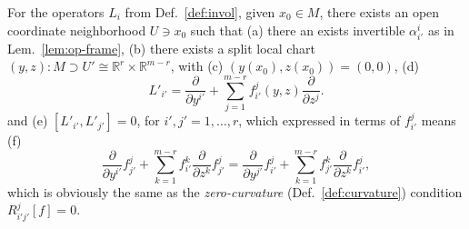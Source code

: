 \begin{lemma} \label{lem:loc-init-split}
For the operators $L_i$ from Def.~\ref{def:invol}, given $x_0 \in M$, there exists
an open coordinate neighborhood $U\ni x_0$ such that (a) there an exists invertible
$\alpha_{i'}^i$ as in Lem.~\ref{lem:op-frame}, (b) there exists a split local
chart $(y,z)\colon M \supset U' \cong \mathbb{R}^r \times \mathbb{R}^{m-r}$, with
(c) $(y(x_0),z(x_0)) = (0,0)$, (d)
\[
  L'_{i'} = \frac{\partial}{\partial y^{i'}} + \sum_{j=1}^{m-r} f_{i'}^j(y,z) \frac{\partial}{\partial z^j} .
\]
and (e) $[L'_{i'}, L'_{j'}] = 0$, for $i',j'=1,\ldots,r$, which expressed in terms of $f_{i'}^j$ means (f)
\[
  \frac{\partial}{\partial y^{i'}} f_{j'}^j
    + \sum_{k=1}^{m-r} f_{i'}^k \frac{\partial}{\partial z^k} f_{j'}^j
  = \frac{\partial}{\partial y^{j'}} f_{i'}^j
    + \sum_{k=1}^{m-r} f_{j'}^k \frac{\partial}{\partial z^k} f_{i'}^j ,
\]
which is obviously the same as the \emph{zero-curvature}
(Def.~\ref{def:curvature}) condition $R_{i'j'}^j[f] = 0$.
\end{lemma}
